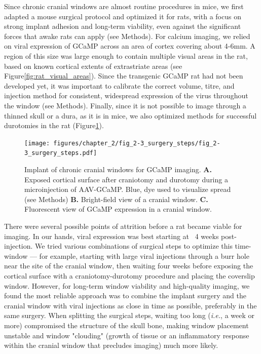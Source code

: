 Since chronic cranial windows are almost routine procedures in mice, we first adapted a mouse surgical protocol\cite{Goldey2014} and optimized it for rats, with a focus on strong implant adhesion and long-term viability, even against the significant forces that awake rats can apply (see Methods). For calcium imaging, we relied on viral expression of GCaMP\cite{Dana2019High-performanceMicrocompartments} across an area of cortex covering about 4-6mm. A region of this size was large enough to contain multiple visual areas in the rat, based on known cortical extents of extrastriate areas (see Figure\ref{fig:rat_visual_areas}). Since the transgenic GCaMP rat \cite{Scott2018} had not been developed yet, it was important to calibrate the correct volume, titre, and injection method for consistent, widespread expression of the virus throughout the window (see Methods). Finally, since it is not possible to image through a thinned skull or a dura, as it is in mice, we also optimized methods for successful durotomies in the rat (Figure\ref{fig:surgery_steps}). 

\begin{figure}[t!]
    \texttt{[image: figures/chapter\_2/fig\_2-3\_surgery\_steps/fig\_2-3\_surgery\_steps.pdf]}
    \vspace{.1in}
    \caption[Chronic cranial window]{Implant of chronic cranial windows for GCaMP imaging. 
    \textbf{A.} Exposed cortical surface after craniotomy and durotomy during a microinjection of AAV-GCaMP. Blue, dye used to visualize spread (see Methods) \textbf{B.} Bright-field view of a cranial window. 
    \textbf{C.} Fluorescent view of GCaMP expression in a cranial window.
    \label{fig:surgery_steps}}
\end{figure}

There were several possible points of attrition before a rat became viable for imaging. In our hands, viral expression was best starting at ~4 weeks post-injection. We tried various combinations of surgical steps to optimize this time-window --- for example, starting with large viral injections through a burr hole near the site of the cranial window, then waiting four weeks before exposing the cortical surface with a craniotomy-durotomy procedure and placing the coverslip window. However, for long-term window viability and high-quality imaging, we found the most reliable approach was to combine the implant surgery and the cranial window with viral injections as close in time as possible, preferably in the same surgery. When splitting the surgical steps, waiting too long (\textit{i.e.}, a week or more) compromised the structure of the skull bone, making window placement unstable and window "clouding" (growth of tissue or an inflammatory response within the cranial window that precludes imaging) much more likely. 

